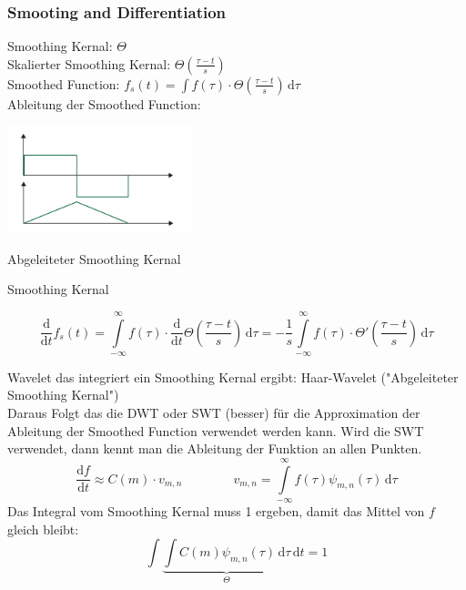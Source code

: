 \subsubsection{Smooting and Differentiation}
\begin{minipage}[r]{0.5\textwidth}
Smoothing Kernal: $\Theta$\\
Skalierter Smoothing Kernal: $\Theta(\frac{\tau - t}{s})$\\
Smoothed Function: $f_s(t) = \int f(\tau) \cdot \Theta(\frac{\tau - t}{s}) \, \mathrm{d}\tau$\\
Ableitung der Smoothed Function: 
\end{minipage}
\begin{minipage}[r]{0.5\textwidth}
	\includegraphics[width=0.4\textwidth]{content/SmoothingFunction.pdf}
	
	\vspace{-2.2cm}
	
	\flushright
	Abgeleiteter Smoothing Kernal
	
	\vspace{.4cm}
	
	Smoothing Kernal	
\end{minipage}

\[ \frac{\mathrm{d}}{\mathrm{d}t}f_s(t) = \int\limits_{-\infty}^{\infty} f(\tau) \cdot \frac{\mathrm{d}}{\mathrm{d}t}\Theta(\frac{\tau - t}{s}) \, \mathrm{d}\tau = -\frac{1}{s} \int\limits_{-\infty}^{\infty} f(\tau) \cdot \Theta'(\frac{\tau - t}{s}) \, \mathrm{d}\tau \]

Wavelet das integriert ein Smoothing Kernal ergibt: Haar-Wavelet ("Abgeleiteter Smoothing Kernal")\\
Daraus Folgt das die DWT oder SWT (besser) für die Approximation der Ableitung der Smoothed Function verwendet werden kann. Wird die SWT verwendet, dann kennt man die Ableitung der Funktion an allen Punkten.
\[ 
	\frac{\mathrm{d}f}{\mathrm{d}t} \approx C(m) \cdot v_{m,n}
	\qquad \qquad
	v_{m,n} =  \int\limits_{-\infty}^{\infty} f(\tau) \psi_{m,n}(\tau) \, \mathrm{d}\tau 
\]
Das Integral vom Smoothing Kernal muss 1 ergeben, damit das Mittel von $f$ gleich bleibt: 
\[ \int \underbrace{\int C(m) \psi_{m,n}(\tau) \,\mathrm{d}\tau}_{\Theta} \,\mathrm{d}t = 1 \]

